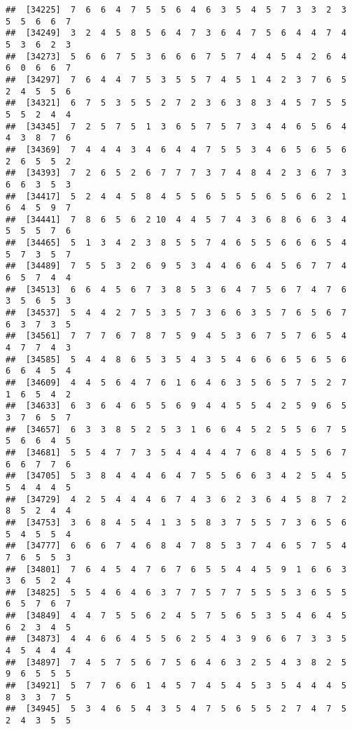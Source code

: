 \documentclass[
]{book}
\begin{document}
\begin{verbatim}
##  [34225]  7  6  6  4  7  5  5  6  4  6  3  5  4  5  7  3  3  2  3  5  5  6  6  7
##  [34249]  3  2  4  5  8  5  6  4  7  3  6  4  7  5  6  4  4  7  4  5  3  6  2  3
##  [34273]  5  6  6  7  5  3  6  6  6  7  5  7  4  4  5  4  2  6  4  6  0  6  6  7
##  [34297]  7  6  4  4  7  5  3  5  5  7  4  5  1  4  2  3  7  6  5  2  4  5  5  6
##  [34321]  6  7  5  3  5  5  2  7  2  3  6  3  8  3  4  5  7  5  5  5  5  2  4  4
##  [34345]  7  2  5  7  5  1  3  6  5  7  5  7  3  4  4  6  5  6  4  4  3  8  7  6
##  [34369]  7  4  4  4  3  4  6  4  4  7  5  5  3  4  6  5  6  5  6  2  6  5  5  2
##  [34393]  7  2  6  5  2  6  7  7  7  3  7  4  8  4  2  3  6  7  3  6  6  3  5  3
##  [34417]  5  2  4  4  5  8  4  5  5  6  5  5  5  6  5  6  6  2  1  6  4  5  9  7
##  [34441]  7  8  6  5  6  2 10  4  4  5  7  4  3  6  8  6  6  3  4  5  5  5  7  6
##  [34465]  5  1  3  4  2  3  8  5  5  7  4  6  5  5  6  6  6  5  4  5  7  3  5  7
##  [34489]  7  5  5  3  2  6  9  5  3  4  4  6  6  4  5  6  7  7  4  6  5  7  4  4
##  [34513]  6  6  4  5  6  7  3  8  5  3  6  4  7  5  6  7  4  7  6  3  5  6  5  3
##  [34537]  5  4  4  2  7  5  3  5  7  3  6  6  3  5  7  6  5  6  7  6  3  7  3  5
##  [34561]  7  7  7  6  7  8  7  5  9  4  5  3  6  7  5  7  6  5  4  4  7  7  4  3
##  [34585]  5  4  4  8  6  5  3  5  4  3  5  4  6  6  6  5  6  5  6  6  6  4  5  4
##  [34609]  4  4  5  6  4  7  6  1  6  4  6  3  5  6  5  7  5  2  7  1  6  5  4  2
##  [34633]  6  3  6  4  6  5  5  6  9  4  4  5  5  4  2  5  9  6  5  3  7  6  5  7
##  [34657]  6  3  3  8  5  2  5  3  1  6  6  4  5  2  5  5  6  7  5  5  6  6  4  5
##  [34681]  5  5  4  7  7  3  5  4  4  4  4  7  6  8  4  5  5  6  7  6  6  7  7  6
##  [34705]  5  3  8  4  4  4  6  4  7  5  5  6  6  3  4  2  5  4  5  5  4  4  4  5
##  [34729]  4  2  5  4  4  4  6  7  4  3  6  2  3  6  4  5  8  7  2  8  5  2  4  4
##  [34753]  3  6  8  4  5  4  1  3  5  8  3  7  5  5  7  3  6  5  6  5  4  5  5  4
##  [34777]  6  6  6  7  4  6  8  4  7  8  5  3  7  4  6  5  7  5  4  7  6  5  5  3
##  [34801]  7  6  4  5  4  7  6  7  6  5  5  4  4  5  9  1  6  6  3  3  6  5  2  4
##  [34825]  5  5  4  6  4  6  3  7  7  5  7  7  5  5  5  3  6  5  5  6  5  7  6  7
##  [34849]  4  4  7  5  5  6  2  4  5  7  5  6  5  3  5  4  6  4  5  6  2  3  4  5
##  [34873]  4  4  6  6  4  5  5  6  2  5  4  3  9  6  6  7  3  3  5  4  5  4  4  4
##  [34897]  7  4  5  7  5  6  7  5  6  4  6  3  2  5  4  3  8  2  5  9  6  5  5  5
##  [34921]  5  7  7  6  6  1  4  5  7  4  5  4  5  3  5  4  4  4  5  8  3  3  7  5
##  [34945]  5  3  4  6  5  4  3  5  4  7  5  6  5  5  2  7  4  7  5  2  4  3  5  5

\end{verbatim}
\end{document}
